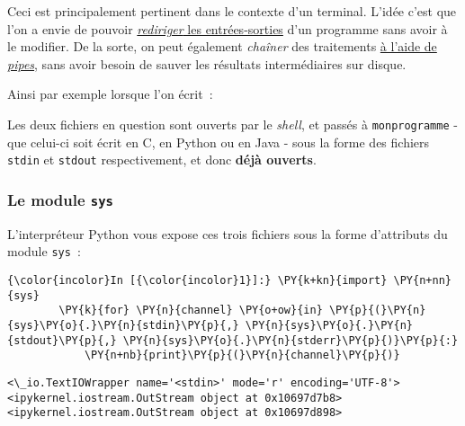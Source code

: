 Ceci est principalement pertinent dans le contexte d'un terminal. L'idée
c'est que l'on a envie de pouvoir
\href{http://en.wikipedia.org/wiki/Redirection_\%28computing\%29}{\emph{rediriger}
les entrées-sorties} d'un programme sans avoir à le modifier. De la
sorte, on peut également \emph{chaîner} des traitements
\href{http://en.wikipedia.org/wiki/Redirection_\%28computing\%29\#Piping}{à
l'aide de \emph{pipes}}, sans avoir besoin de sauver les résultats
intermédiaires sur disque.

    Ainsi par exemple lorsque l'on écrit~:

\begin{Shaded}
\begin{Highlighting}[frame=lines,framerule=0.6mm,rulecolor=\color{asisframecolor}]
\NormalTok{$ } \OperatorTok{<}\OperatorTok{>}
\end{Highlighting}
\end{Shaded}

Les deux fichiers en question sont ouverts par le \emph{shell}, et
passés à \texttt{monprogramme} - que celui-ci soit écrit en C, en Python
ou en Java - sous la forme des fichiers \texttt{stdin} et
\texttt{stdout} respectivement, et donc \textbf{déjà ouverts}.

    \hypertarget{le-module-sys}{%
\subsubsection{\texorpdfstring{Le module
\texttt{sys}}{Le module sys}}\label{le-module-sys}}

    L'interpréteur Python vous expose ces trois fichiers sous la forme
d'attributs du module \texttt{sys}~:

    \begin{Verbatim}[commandchars=\\\{\},frame=single,framerule=0.3mm,rulecolor=\color{cellframecolor}]
{\color{incolor}In [{\color{incolor}1}]:} \PY{k+kn}{import} \PY{n+nn}{sys}
        \PY{k}{for} \PY{n}{channel} \PY{o+ow}{in} \PY{p}{(}\PY{n}{sys}\PY{o}{.}\PY{n}{stdin}\PY{p}{,} \PY{n}{sys}\PY{o}{.}\PY{n}{stdout}\PY{p}{,} \PY{n}{sys}\PY{o}{.}\PY{n}{stderr}\PY{p}{)}\PY{p}{:}
            \PY{n+nb}{print}\PY{p}{(}\PY{n}{channel}\PY{p}{)}
\end{Verbatim}


    \begin{Verbatim}[commandchars=\\\{\},frame=single,framerule=0.3mm,rulecolor=\color{cellframecolor}]
<\_io.TextIOWrapper name='<stdin>' mode='r' encoding='UTF-8'>
<ipykernel.iostream.OutStream object at 0x10697d7b8>
<ipykernel.iostream.OutStream object at 0x10697d898>
\end{Verbatim}

